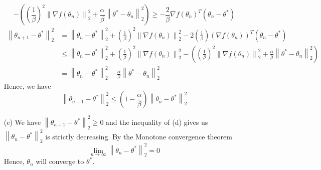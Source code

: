 \documentclass[12pt,a4paper]{article}
\begin{document}
\begin{enumerate}
\begin{equation*}
            -((\frac{1}{\beta})^{2} \left\lVert \nabla f(\theta_{n})\right\rVert  _2^2 + \frac{\alpha}{\beta}\left\lVert \theta^{*} - \theta_{n}\right\rVert _{2}^{2}) \geq -\frac{2}{\beta}\nabla f(\theta_{n})^T(\theta_{n} - \theta^{*})
        \end{equation*}
        \begin{equation*}
            \begin{split}
                \left\lVert \theta_{n+1} - \theta^*\right\rVert _2^2 
                    &= \left\lVert \theta_n - \theta^*\right\rVert _{2}^{2} + (\frac{1}{\beta})^{2}\left\lVert \nabla f(\theta_n)\right\rVert _{2}^{2} - 2(\frac{1}{\beta})(\nabla f(\theta_n))^T(\theta_n - \theta^*)\\
                    &\leq \left\lVert \theta_n - \theta^*\right\rVert _{2}^{2} + (\frac{1}{\beta})^{2}\left\lVert \nabla f(\theta_n)\right\rVert _{2}^{2} -((\frac{1}{\beta})^{2} \left\lVert \nabla f(\theta_{n})\right\rVert  _2^2 + \frac{\alpha}{\beta}\left\lVert \theta^{*} - \theta_{n}\right\rVert _{2}^{2})\\
                    &= \left\lVert \theta_n - \theta^*\right\rVert _{2}^{2} - \frac{\alpha}{\beta}\left\lVert \theta^{*} - \theta_{n}\right\rVert _{2}^{2}
            \end{split}
        \end{equation*}
        Hence, we have
        \begin{equation*}
            \left\lVert \theta_{n+1} - \theta^*\right\rVert _2^2 \leq (1 - \frac{\alpha}{\beta})\left\lVert \theta_{n} - \theta^{*} \right\rVert _{2}^{2}
        \end{equation*}
    \item[(e)]
        We have $\left\lVert \theta_{n+1} - \theta^*\right\rVert _2^2 \geq 0$ and the inequality of (d) gives us $\left\lVert \theta_{n} - \theta^*\right\rVert _2^2$ is strictly decreasing.
        By the Monotone convergence theorem
        \begin{equation*}
            \lim_{n\to \infty} \left\lVert \theta_{n} - \theta^*\right\rVert _2^2 = 0
        \end{equation*}
        Hence, $\theta_{n}$ will converge to $\theta^{*}$.
\end{enumerate}
\end{document}

